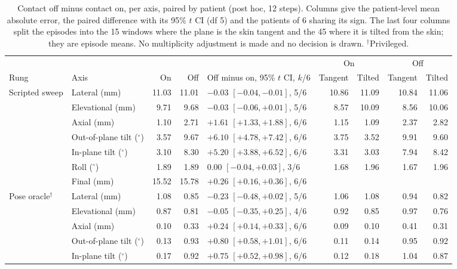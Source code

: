 
\begin{table}[tbp]
\renewcommand{\baselinestretch}{1}\scriptsize
\caption{Contact off minus contact on, per axis, paired by patient (post hoc, 12 steps). Columns give the patient-level mean absolute error, the paired difference with its 95\% $t$ CI (df 5) and the patients of 6 sharing its sign. The last four columns split the episodes into the 15 windows where the plane is the skin tangent and the 45 where it is tilted from the skin; they are episode means. No multiplicity adjustment is made and no decision is drawn. $^{\dagger}$Privileged.}
\label{tab:posthoc-contact}
\centering
\setlength{\tabcolsep}{2.5pt}
\begin{tabular}{@{}l l rr l rr rr@{}}
\toprule
 & & & & & \multicolumn{2}{c}{On} & \multicolumn{2}{c}{Off} \\
\cmidrule(lr){6-7}\cmidrule(lr){8-9}
Rung & Axis & On & Off & Off minus on, 95\% $t$ CI, $k$/6 & Tangent & Tilted & Tangent & Tilted \\
\midrule
Scripted sweep & Lateral (mm) & 11.03 & 11.01 & $-0.03$ $[-0.04, -0.01]$, 5/6 & 10.86 & 11.09 & 10.84 & 11.06 \\
 & Elevational (mm) & 9.71 & 9.68 & $-0.03$ $[-0.06, +0.01]$, 5/6 & 8.57 & 10.09 & 8.56 & 10.06 \\
 & Axial (mm) & 1.10 & 2.71 & $+1.61$ $[+1.33, +1.88]$, 6/6 & 1.15 & 1.09 & 2.37 & 2.82 \\
 & Out-of-plane tilt ($^{\circ}$) & 3.57 & 9.67 & $+6.10$ $[+4.78, +7.42]$, 6/6 & 3.75 & 3.52 & 9.91 & 9.60 \\
 & In-plane tilt ($^{\circ}$) & 3.10 & 8.30 & $+5.20$ $[+3.88, +6.52]$, 6/6 & 3.31 & 3.03 & 7.94 & 8.42 \\
 & Roll ($^{\circ}$) & 1.89 & 1.89 & $0.00$ $[-0.04, +0.03]$, 3/6 & 1.68 & 1.96 & 1.67 & 1.96 \\
 & Final (mm) & 15.52 & 15.78 & $+0.26$ $[+0.16, +0.36]$, 6/6 & & & & \\
\addlinespace[2pt]
Pose oracle$^{\dagger}$ & Lateral (mm) & 1.08 & 0.85 & $-0.23$ $[-0.48, +0.02]$, 5/6 & 1.06 & 1.08 & 0.94 & 0.82 \\
 & Elevational (mm) & 0.87 & 0.81 & $-0.05$ $[-0.35, +0.25]$, 4/6 & 0.92 & 0.85 & 0.97 & 0.76 \\
 & Axial (mm) & 0.10 & 0.33 & $+0.24$ $[+0.14, +0.33]$, 6/6 & 0.09 & 0.10 & 0.41 & 0.31 \\
 & Out-of-plane tilt ($^{\circ}$) & 0.13 & 0.93 & $+0.80$ $[+0.58, +1.01]$, 6/6 & 0.11 & 0.14 & 0.95 & 0.92 \\
 & In-plane tilt ($^{\circ}$) & 0.17 & 0.92 & $+0.75$ $[+0.52, +0.98]$, 6/6 & 0.12 & 0.18 & 1.04 & 0.87 \\

\end{tabular}
\end{table}
